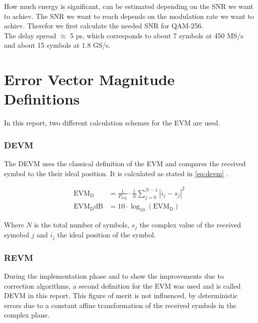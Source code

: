 How much energy is significant, can be estimated depending on the \gls{SNR}
we want to achiev. The \gls{SNR} we want to reach depends on the modulation rate
we want to achiev. Therefor we first calculate the needed \gls{SNR} for
\gls{QAM}-256. \\

The delay spread $\approx $ 5 ps, which corresponds to about 7 symbols
at 450 MS/s and about 15 symbols at 1.8 GS/s. \\


\section{Error Vector Magnitude Definitions}
In this report, two different calculation schemes for the \acrfull{EVM}
are used.

\subsubsection{\acrfull{DEVM}}
The \gls{DEVM} uses the classical definition of the \gls{EVM}
and compares the received symbol to the their ideal position.
It is calculated as stated in \eqref{eq:devm} \cite{razavi2011rf}.

\begin{align}
  \text{EVM}_\text{D} &= \frac{1}{P_{\text{avg}}} \cdot \frac{1}{N}
  \sum_{j=0}^{N-1} |i_j - s_j|^2
  \label{eq:devm} \\
  \text{EVM}_\text{D}\text{dB} &= 10 \cdot \log_{10} (\text{EVM}_\text{D})
\end{align}

Where $N$ is the total number of symbols, $s_j$ the complex value of the
received symobol $j$ and $i_j$ the ideal position of the symbol. \\

\subsubsection{\acrfull{REVM}}
During the implementation phase and to show the improvements due to correction
algorithms, a second definition for the \gls{EVM} was used and
is called \gls{DEVM} in this report. This figure of merit is not influenced,
by deterministic errors due to a constant affine transformation of the
received symbols in the complex plane. \\

